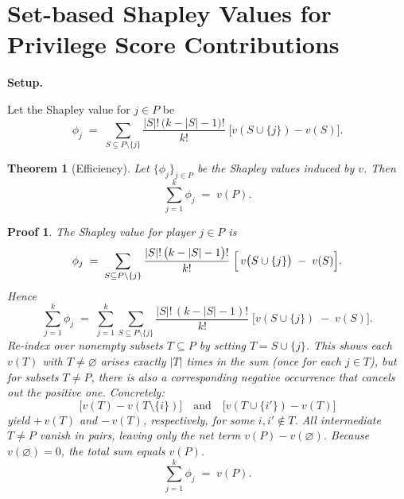 \documentclass{article}
\begin{document}
\newtheorem{theorem}{Theorem}
\newtheorem{proof_sketch}{Proof}
\newtheorem{proofsketch}{Proof (Step-by-Step)}

\section*{Set-based Shapley Values for Privilege Score Contributions}

\textbf{Setup.} 

Let the Shapley value for $j \in P$ be
\[
\phi_j \;=\;
\sum_{S \subseteq P \setminus \{j\}}
\frac{|S|!\,\bigl(k - |S| -1\bigr)!}{k!}
\;
\bigl[v(S \cup \{j\}) - v(S)\bigr].
\]

\begin{theorem}[Efficiency]
Let $\{\phi_j\}_{j \in P}$ be the Shapley values induced by $v$. Then
\[
\sum_{j=1}^k \phi_j
\;=\;
v(P).
\]
\end{theorem}

\begin{proof_sketch}
The Shapley value for player $j \in P$ is 
\[
\phi_j 
\;=\;
\sum_{S \subseteq P \setminus \{j\}}
\frac{|S|!\,\bigl(k - |S| - 1\bigr)!}{k!}
\;\Bigl[\,v\bigl(S \cup \{j\}\bigr) \;-\; v(S)\Bigr].
\]
Hence
\[
\sum_{j=1}^k \phi_j
\;=\;
\sum_{j=1}^k
\sum_{S \subseteq P \setminus \{j\}}
\frac{|S|!\,(k - |S| - 1)!}{k!}
\;\bigl[v(S \cup \{j\}) \;-\; v(S)\bigr].
\]
Re-index over nonempty subsets $T \subseteq P$ by setting $T = S \cup \{j\}$. This shows each $v(T)$ with $T\neq \varnothing$ arises exactly $|T|$ times in the sum (once for each $j \in T$), but for subsets $T \neq P$, there is also a corresponding negative occurrence that cancels out the positive one. Concretely:
\[
\bigl[v(T) - v(T \setminus \{i\})\bigr]
\quad \text{and} \quad
\bigl[v(T \cup \{i'\}) - v(T)\bigr]
\]
yield $+\,v(T)$ and $-\,v(T)$, respectively, for some $i,i'\notin T$. 
All intermediate $T \neq P$ vanish in pairs, leaving only the net term $v(P) - v(\varnothing)$. Because $v(\varnothing)=0$, the total sum equals $v(P)$. 
\[
\sum_{j=1}^k \phi_j \;=\; v(P).
\]
\end{proof_sketch}
\end{document}
